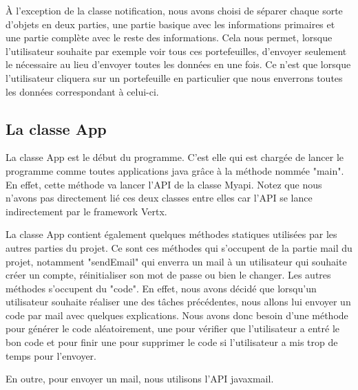\begin{flushleft}
À l'exception de la classe notification, nous avons choisi de séparer chaque sorte d'objets en deux parties, une partie basique avec les informations primaires et une partie complète avec le reste des informations. Cela nous permet, lorsque l'utilisateur souhaite par exemple voir tous ces portefeuilles, d'envoyer seulement le nécessaire au lieu d'envoyer toutes les données en une fois. Ce n'est que lorsque l'utilisateur cliquera sur un portefeuille en particulier que nous enverrons toutes les données correspondant à celui-ci.
\end{flushleft}
\newpage
\subsection{La classe App}

\begin{flushleft}
La classe App est le début du programme. C'est elle qui est chargée de lancer le programme comme toutes applications java grâce à la méthode nommée "main". En effet, cette méthode va lancer l'API de la classe Myapi. Notez que nous n'avons pas directement lié ces deux classes entre elles car l'API se lance indirectement par le framework Vertx.
\end{flushleft}

\begin{flushleft}
La classe App contient également quelques méthodes statiques utilisées par les autres parties du projet. Ce sont ces méthodes qui s'occupent de la partie mail du projet, notamment "sendEmail" qui enverra un mail à un utilisateur qui souhaite créer un compte, réinitialiser son mot de passe ou bien le changer. Les autres méthodes s'occupent du "code". En effet, nous avons décidé que lorsqu'un utilisateur souhaite réaliser une des tâches précédentes, nous allons lui envoyer un code par mail avec quelques explications. Nous avons donc besoin d'une méthode pour générer le code aléatoirement, une pour vérifier que l'utilisateur a entré le bon code et pour finir une pour supprimer le code si l'utilisateur a mis trop de temps pour l'envoyer.
\end{flushleft}

\begin{flushleft}
En outre, pour envoyer un mail, nous utilisons l'API javaxmail.
\end{flushleft}


